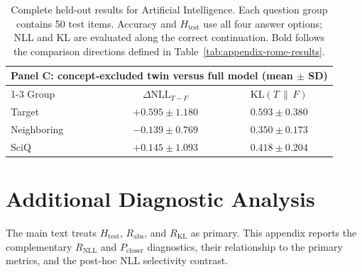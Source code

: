 \begin{table}[h]
  \vspace{1em}
  \begin{tabular}{lcc}
    \toprule
    \multicolumn{3}{l}{\textbf{Panel C: concept-excluded twin versus full model (mean $\pm$ SD)}} \\
    \cmidrule(lr){1-3}
    Group & $\Delta\mathrm{NLL}_{T-F}$ & $\mathrm{KL}(T\,\|\,F)$ \\
    \midrule
    Target      & $+0.595 \pm 1.180$ & $0.593 \pm 0.380$ \\
    Neighboring & $-0.139 \pm 0.769$ & $0.350 \pm 0.173$ \\
    SciQ        & $+0.145 \pm 1.093$ & $0.418 \pm 0.204$ \\
    \bottomrule
  \end{tabular}
  \caption{Complete held-out results for Artificial Intelligence. Each question group
  contains 50 test items. Accuracy and $H_{\mathrm{test}}$ use all four answer
  options; NLL and KL are evaluated along the correct continuation. Bold
  follows the comparison directions defined in
  Table~\ref{tab:appendix-rome-results}.}
  \label{tab:appendix-ai-results}
\end{table}

\clearpage

\section{Additional Diagnostic Analysis}
\label{app:diagnostics}

The main text treats $H_{\mathrm{test}}$, $R_{\mathrm{abs}}$, and
$R_{\mathrm{KL}}$ as primary. This appendix reports the complementary
$R_{\mathrm{NLL}}$ and $P_{\mathrm{closer}}$ diagnostics, their relationship
to the primary metrics, and the post-hoc NLL selectivity contrast.

